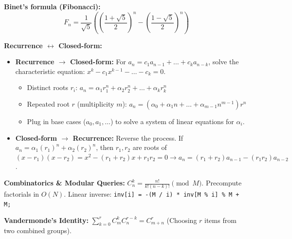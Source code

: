 
\textbf{Binet's formula (Fibonacci):}
$$F_n = \frac{1}{\sqrt{5}} \left( \left( \frac{1 + \sqrt{5}}{2} \right)^n - \left( \frac{1 - \sqrt{5}}{2} \right)^n \right)$$

\textbf{Recurrence $\leftrightarrow$ Closed-form:}
\begin{itemize}
    \item \textbf{Recurrence $\rightarrow$ Closed-form:} For $a_n = c_1 a_{n-1} + \dots + c_k a_{n-k}$, solve the characteristic equation: $x^k - c_1 x^{k-1} - \dots - c_k = 0$.
    \begin{itemize}
        \item Distinct roots $r_i$: $a_n = \alpha_1 r_1^n + \alpha_2 r_2^n + \dots + \alpha_k r_k^n$
        \item Repeated root $r$ (multiplicity $m$): $a_n = (\alpha_0 + \alpha_1 n + \dots + \alpha_{m-1} n^{m-1}) r^n$
        \item[$\rightarrow$] Plug in base cases ($a_0, a_1, \dots$) to solve a system of linear equations for $\alpha_i$.
    \end{itemize}
    \item \textbf{Closed-form $\rightarrow$ Recurrence:} Reverse the process. If $a_n = \alpha_1 (r_1)^n + \alpha_2 (r_2)^n$, then $r_1, r_2$ are roots of $(x-r_1)(x-r_2) = x^2 - (r_1+r_2)x + r_1r_2 = 0 \rightarrow a_n = (r_1+r_2)a_{n-1} - (r_1r_2)a_{n-2}$.
\end{itemize}


\textbf{Combinatorics \& Modular Queries:}
$C_n^k = \frac{n!}{k!(n-k)!} \pmod M$. Precompute factorials in $O(N)$. Linear inverse:
\lstinline|inv[i] = -(M / i) * inv[M % i] % M + M;|

\textbf{Vandermonde's Identity:} $\sum_{k=0}^r C_m^k C_n^{r-k} = C_{m+n}^r$ (Choosing $r$ items from two combined groups).

